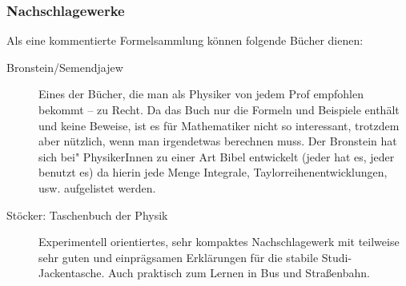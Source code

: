 \subsubsection*{Nachschlagewerke}

Als eine kommentierte Formelsammlung können folgende Bücher dienen:

\begin{description}
\item[Bronstein/Semendjajew]{
		Eines der Bücher, die man als Physiker von jedem Prof empfohlen bekommt -- zu Recht. Da das Buch nur die Formeln und Beispiele enthält und keine Beweise, ist es für Mathematiker nicht so interessant, trotzdem aber nützlich, wenn man irgendetwas berechnen muss. Der Bronstein hat sich bei" PhysikerInnen zu einer Art Bibel entwickelt (jeder hat es, jeder benutzt es) da hierin jede Menge Integrale, Taylorreihenentwicklungen, usw. aufgelistet werden.}

\item[Stöcker: Taschenbuch der Physik]{
		Experimentell orientiertes, sehr kompaktes Nachschlagewerk mit teilweise sehr guten und einprägsamen Erklärungen für die stabile Studi- Jackentasche. Auch praktisch zum Lernen in Bus und Straßenbahn.}
\end{description}
